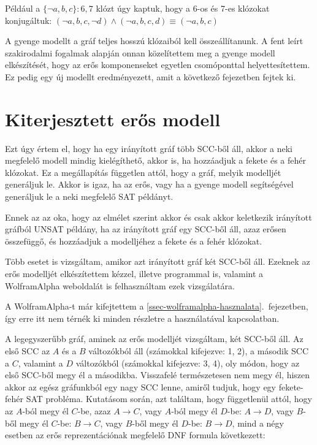 \documentclass[
]{thesis-ekf}
\theoremstyle{definition}
\theoremstyle{remark}
\begin{document}
	Például a $ \{\neg a,b,c\} :6,7 $ klózt úgy kaptuk, hogy a 6-os és 7-es klózokat konjugáltuk:
	$ (\neg a,b,c,\neg d)\wedge(\neg a,b,c,d)\equiv(\neg a,b,c) $
		
	A gyenge modellt a gráf teljes hosszú klózaiból kell összeállítanunk. A fent leírt szakirodalmi fogalmak alapján onnan közelítettem meg a gyenge modell elkészítését, hogy az erős komponenseket egyetlen csomóponttal helyettesítettem. Ez pedig egy új modellt eredményezett, amit a következő fejezetben fejtek ki.
	
	\section{Kiterjesztett erős modell}\label{sec-esm}

	Ezt úgy értem el, hogy ha egy irányított gráf több \textsc{SCC}-ből áll, akkor a neki megfelelő modell mindig kielégíthető, akkor is, ha hozzáadjuk a fekete és a fehér klózokat. Ez a megállapítás független attól, hogy a gráf, melyik modelljét generáljuk le. Akkor is igaz, ha az erős, vagy ha a gyenge modell segítségével generáljuk le a neki megfelelő \textsc{SAT} példányt.
	
	Ennek az az oka, hogy az elmélet szerint akkor és csak akkor keletkezik irányított gráfból \textsc{UNSAT} példány, ha az irányított gráf egy \textsc{SCC}-ből áll, azaz erősen összefüggő, és hozzáadjuk a modelljéhez a fekete és a fehér klózokat.
	
	Több esetet is vizsgáltam, amikor azt irányított gráf két \textsc{SCC}-ből áll. Ezeknek az erős modelljét elkészítettem kézzel, illetve programmal is, valamint a WolframAlpha weboldalát is felhasználtam ezek vizsgálatára.
	
	A WolframAlpha-t már kifejtettem a \ref{ssec-wolframalpha-hasznalata}.~fejezetben, így erre itt nem térnék ki minden részletre a használatával kapcsolatban.
	 
	A legegyszerűbb gráf, aminek az erős modelljét vizsgáltam, két \textsc{SCC}-ből áll. Az első \textsc{SCC} az $A$ és a $B$ változókból áll (számokkal kifejezve: 1, 2), a második \textsc{SCC} a $C$, valamint a $D$ változókból (számokkal kifejezve: 3, 4), oly módon, hogy az első \textsc{SCC}-ből megy él a másodikba. Visszafelé természetesen nem megy él, hiszen akkor az egész gráfunkból egy nagy \textsc{SCC} lenne, amiről tudjuk, hogy egy fekete-fehér \textsc{SAT} probléma. Kutatásom során, azt találtam, hogy függetlenül attól, hogy az $A$-ból megy él $C$-be, azaz $ A \rightarrow C $, vagy $A$-ból megy él $D$-be: $A \rightarrow D$, vagy $B$-ből megy él $C$-be: $B\rightarrow C$, vagy $B$-ből megy él $D$-be: $B\rightarrow D$, mind a négy esetben az erős reprezentációnak megfelelő \textsc{DNF} formula következett:
	
\end{document}

